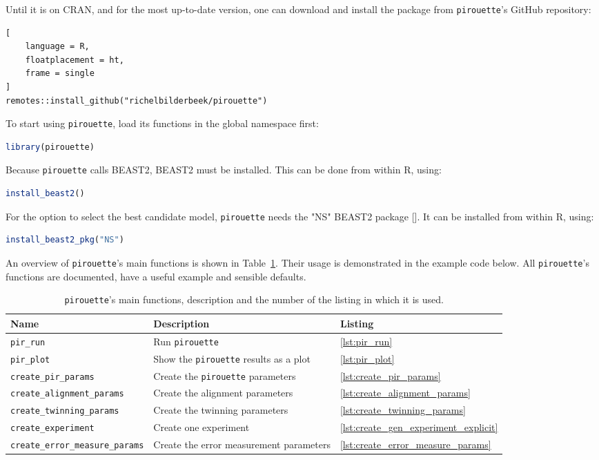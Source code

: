 Until it is on CRAN, and for the most up-to-date version, 
one can download and install the package from \verb;pirouette;'s GitHub 
repository:

\begin{lstlisting}[
    language = R,
    floatplacement = ht,
    frame = single
]
remotes::install_github("richelbilderbeek/pirouette")
\end{lstlisting}
To start using \verb;pirouette;, 
load its functions in the global namespace first:
\begin{lstlisting}[language=R, floatplacement=ht, frame=single]
library(pirouette)
\end{lstlisting}
Because \verb;pirouette; calls BEAST2, BEAST2 must be installed. 
This can be done from within R, using:
\begin{lstlisting}[language=R, floatplacement=ht, frame=single]
install_beast2()
\end{lstlisting}
For the option to select the best candidate model,
\verb;pirouette; needs the "NS" BEAST2 package [\cite{russel2019model}].
It can be installed from within R, using:
\begin{lstlisting}[language=R, floatplacement=ht, frame=single]
install_beast2_pkg("NS")
\end{lstlisting}

An overview of \verb;pirouette;'s main functions is shown in 
Table~\ref{tab:functions}. 
Their usage is demonstrated in the example code below.
All \verb;pirouette;'s functions are documented,
have a useful example and sensible defaults.

\begin{table}[h]
  \centering
  \begin{tabular}{ | l | l | l | }
    \hline
    \textbf{Name} & \textbf{Description} & \textbf{Listing} \\
    \hline
    \verb;pir_run; & Run \verb;pirouette; & \ref{lst:pir_run} \\
    \verb;pir_plot; & Show the \verb;pirouette; results as a plot & \ref{lst:pir_plot} \\
    \verb;create_pir_params; & Create the \verb;pirouette; parameters & \ref{lst:create_pir_params} \\
    \hline
    \verb;create_alignment_params; & Create the alignment parameters & \ref{lst:create_alignment_params} \\
    \verb;create_twinning_params; & Create the twinning parameters & \ref{lst:create_twinning_params} \\
    \verb;create_experiment; & Create one experiment & \ref{lst:create_gen_experiment_explicit} \\
    \verb;create_error_measure_params; & Create the error measurement parameters & \ref{lst:create_error_measure_params} \\
    \hline
  \end{tabular}
  \caption{
    \texttt{pirouette}'s main functions, description and the number of the 
    listing in which it is used. 
  }
  \label{tab:functions}
\end{table}

